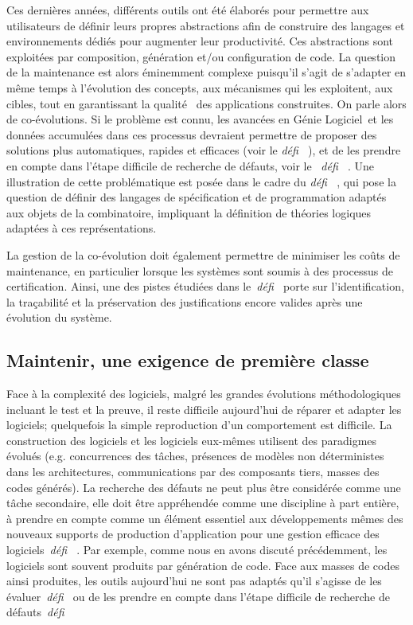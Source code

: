 \documentclass[11pt]{article}
\newcommand{\GL}[0]{Génie Logiciel\xspace}
\newcommand{\defi}[1]{\emph{défi~%
\cite{#1}}}
\begin{document}
Ces dernières années, différents outils ont été élaborés pour permettre aux utilisateurs de définir leurs  propres abstractions afin de construire des langages et environnements dédiés pour augmenter leur productivité. Ces abstractions sont exploitées par composition, génération et/ou configuration de code. La question de la maintenance est alors éminemment complexe puisqu'il s'agit de s'adapter en même temps à l'évolution des concepts, aux mécanismes qui les exploitent, aux cibles, tout en garantissant la \og qualité \fg~des applications construites. On parle alors de co-évolutions. Si le problème est connu, les avancées en \GL~et les données accumulées dans ces processus devraient permettre de proposer des solutions plus automatiques, rapides et efficaces (voir le \defi{coevolution}), et de les prendre en compte dans l'étape difficile de recherche de défauts,  voir le 
~\defi{debuggers}. Une illustration de cette problématique est posée dans le cadre du \defi{combinatoire}, qui pose la question de définir des langages de spécification et de programmation adaptés aux objets de la combinatoire, impliquant la définition de théories logiques adaptées à ces représentations.


La gestion de la co-évolution doit également permettre de minimiser les coûts de maintenance, en particulier lorsque les systèmes sont soumis à des processus de certification. Ainsi, une des pistes étudiées dans le~\defi{argumentation} porte sur l'identification, la traçabilité et la préservation des justifications encore valides après une évolution du système. 



\subsection{Maintenir, une exigence de première classe \label{ss:maintenance:debugger}}
Face à la complexité des logiciels, malgré les grandes évolutions méthodologiques incluant le test et la preuve, il reste difficile aujourd'hui de réparer et adapter les logiciels; quelquefois la simple reproduction d'un comportement est difficile. 
La construction des logiciels et les 
logiciels eux-mêmes utilisent des paradigmes évolués (e.g. concurrences des tâches, présences de modèles  non déterministes dans les architectures, communications par des composants tiers, masses des codes générés). 
La  recherche des défauts ne peut plus être considérée comme une tâche secondaire, elle doit être appréhendée comme une discipline à part entière, à prendre en compte comme un élément essentiel aux développements mêmes des nouveaux supports de production d'application pour une gestion efficace des logiciels~\defi{debuggers}.
Par exemple, comme nous en avons discuté précédemment, les logiciels sont souvent produits par génération de code. Face aux masses de codes ainsi produites, les outils aujourd'hui ne sont pas adaptés qu'il s'agisse de les évaluer~\defi{coevolution} ou de les prendre en compte dans l'étape difficile de recherche de défauts~\defi{debuggers}
\end{document}
